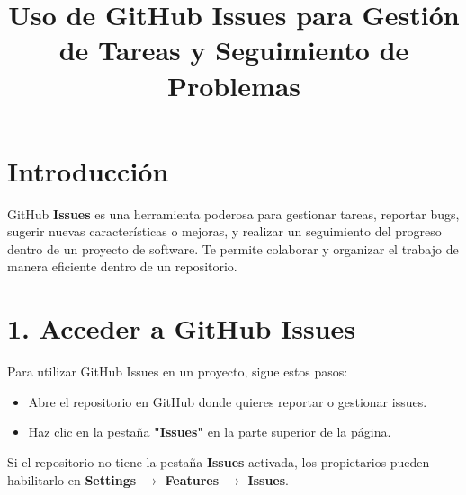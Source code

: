 \documentclass{article}
\title{Uso de GitHub Issues para Gestión de Tareas y Seguimiento de Problemas}
\author{}
\date{}
\begin{document}
\maketitle

\section{Introducción}
GitHub \textbf{Issues} es una herramienta poderosa para gestionar tareas, reportar bugs, sugerir nuevas características o mejoras, y realizar un seguimiento del progreso dentro de un proyecto de software. Te permite colaborar y organizar el trabajo de manera eficiente dentro de un repositorio.

\section{1. Acceder a GitHub Issues}
Para utilizar GitHub Issues en un proyecto, sigue estos pasos:
\begin{itemize}
    \item Abre el repositorio en GitHub donde quieres reportar o gestionar issues.
    \item Haz clic en la pestaña \textbf{"Issues"} en la parte superior de la página.
\end{itemize}

Si el repositorio no tiene la pestaña \textbf{Issues} activada, los propietarios pueden habilitarlo en \textbf{Settings $\rightarrow$ Features $\rightarrow$ Issues}.
\end{document}
